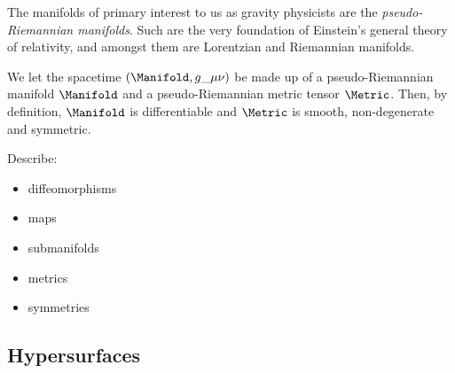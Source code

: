 









The manifolds of primary interest to us as gravity physicists are the \textit{pseudo-Riemannian manifolds}. Such are the very foundation of Einstein's general theory of relativity, and amongst them are Lorentzian and Riemannian manifolds.


We let the spacetime $(\Manifold, g\_{\mu\nu})$ be made up of a pseudo-Riemannian manifold $\Manifold$ and a pseudo-Riemannian metric tensor $\Metric$. Then, by definition, $\Manifold$ is differentiable and $\Metric$ is smooth, non-degenerate  and symmetric.




\begin{bullets}
    \item Describe:\begin{itemize}
        \item diffeomorphisms
        \item maps
        \item submanifolds
        \item metrics
        \item symmetries 
    \end{itemize}
\end{bullets}




\subsection{Hypersurfaces}
